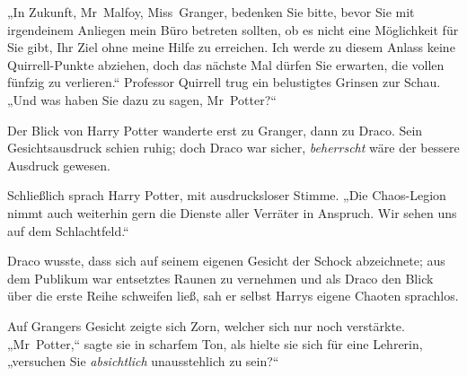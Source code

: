 „In Zukunft, Mr~Malfoy, Miss~Granger, bedenken Sie bitte, bevor Sie mit irgendeinem Anliegen mein Büro betreten sollten, ob es nicht eine Möglichkeit für Sie gibt, Ihr Ziel ohne meine Hilfe zu erreichen. Ich werde zu diesem Anlass keine Quirrell-Punkte abziehen, doch das nächste Mal dürfen Sie erwarten, die vollen fünfzig zu verlieren.“ Professor Quirrell trug ein belustigtes Grinsen zur Schau. „Und was haben Sie dazu zu sagen, Mr~Potter?“

Der Blick von Harry Potter wanderte erst zu Granger, dann zu Draco. Sein Gesichtsausdruck schien ruhig; doch Draco war sicher, \emph{beherrscht} wäre der bessere Ausdruck gewesen.

Schließlich sprach Harry Potter, mit ausdrucksloser Stimme. „Die Chaos-Legion nimmt auch weiterhin gern die Dienste aller Verräter in Anspruch. Wir sehen uns auf dem Schlachtfeld.“

Draco wusste, dass sich auf seinem eigenen Gesicht der Schock abzeichnete; aus dem Publikum war entsetztes Raunen zu vernehmen und als Draco den Blick über die erste Reihe schweifen ließ, sah er selbst Harrys eigene Chaoten sprachlos.

Auf Grangers Gesicht zeigte sich Zorn, welcher sich nur noch verstärkte. „Mr~Potter,“ sagte sie in scharfem Ton, als hielte sie sich für eine Lehrerin, „versuchen Sie \emph{absichtlich} unausstehlich zu sein?“

